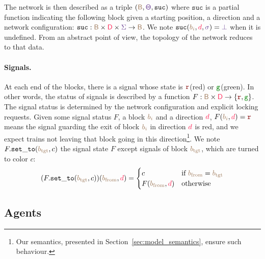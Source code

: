 \documentclass[runningheads]{llncs}
\newcommand{\directions}{\dirFmt{\mathsf{D}}}
\newcommand{\sucblock}{{\mathtt{suc}}}
\newcommand{\dirFmt}[1]{{\color{dircolor} #1}}
\newcommand{\posFmt}[1]{{\color{poscolor}{#1}}}
\newcommand{\blocks}{{\posFmt{\mathsf{B}}}}
\newcommand{\bid}[1]{\ensuremath{\posFmt{b_{#1}}}}
\newcommand{\suc}[3]{\ensuremath{\sucblock(\posFmt{#1}, \dirFmt{#2}, \swFmt{#3})}}
\newcommand{\swFmt}[1]{{\color{swcolor}{#1}}}
\newcommand{\turnouts}{\swFmt{\mathsf{\Theta}}}
\newcommand{\switches}{\ensuremath{\swFmt{\sigma}}}
\newcommand{\networkConf}{\ensuremath{\swFmt{\Sigma}}}
\newcommand{\nosuc}{\ensuremath{\swFmt{\bot}}}
\newcommand{\sigred}{{\mbox{${\color{red!50!black}\mathtt{r}}$}}\xspace}
\newcommand{\siggreen}{{\mbox{${\color{green!50!black}\mathtt{g}}$}}\xspace}
\newcommand{\signalF}[2]{\ensuremath{\signals(\posFmt{#1}, \dirFmt{#2})}}
\newcommand{\signals}{\ensuremath{F}}
\newcommand{\setSignalsTo}[2]{\signals.{\tt set\_to}(#1, #2)}
\begin{document}
The network is then described as a triple $(\blocks, \turnouts, \sucblock)$ where $\sucblock$ is a partial function indicating the following block given a starting position, a direction and a network configuration: $\sucblock: \blocks\times \directions \times \networkConf \to \blocks$. We note $\suc{\bid{i}}{d}{\switches} = \nosuc$ when it is undefined. From an abstract point of view, the topology of the network reduces to that data.  


\paragraph{Signals.}
At each end of the blocks, there is a signal whose state is \sigred (red) or \siggreen (green). In other words, the status of signals is described by a function $\signals: \blocks \times \directions \to \{ \sigred, \siggreen\}$. The signal status is determined by the network configuration and explicit locking requests. Given some signal status $\signals$, a block $\bid{i}$ and a direction $\dirFmt{d}$, $\signalF{\bid{i}}{d} = \sigred$ means the signal guarding the exit of block $\bid{i}$ in direction $\dirFmt{d}$ is red, and we expect trains not leaving that block going in this direction\footnote{Our semantics, presented in Section~\ref{sec:model_semantics}, ensure such behaviour.}. We note $\setSignalsTo{\bid{\text{tgt}}}{c}$ the signal state $\signals$ except signals of block \bid{\text{tgt}}, which are turned to color $c$: 
$$(\setSignalsTo{\bid{\text{tgt}}}{c})(\bid{\text{from}}, \dirFmt{d}) = \begin{cases}
	c & \text{if }\bid{\text{from}} = \bid{\text{tgt}}\\
	\signalF{\bid{\text{from}}}{d} & \text{otherwise}
\end{cases}$$


\subsection{Agents}
\end{document}
